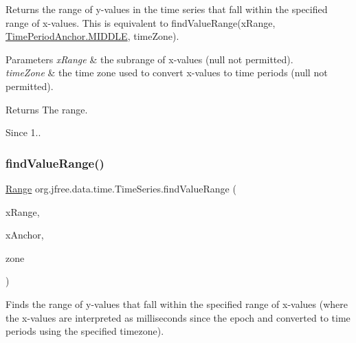 Returns the range of y-\/values in the time series that fall within the specified range of x-\/values. This is equivalent to {\ttfamily find\+Value\+Range(x\+Range, \mbox{\hyperlink{classorg_1_1jfree_1_1data_1_1time_1_1_time_period_anchor_ae6b2bf8530ce0773f48dea83a2594414}{Time\+Period\+Anchor.\+M\+I\+D\+D\+LE}}, time\+Zone)}.


\begin{DoxyParams}{Parameters}
{\em x\+Range} & the subrange of x-\/values ({\ttfamily null} not permitted). \\
\hline
{\em time\+Zone} & the time zone used to convert x-\/values to time periods ({\ttfamily null} not permitted).\\
\hline
\end{DoxyParams}
\begin{DoxyReturn}{Returns}
The range.
\end{DoxyReturn}
\begin{DoxySince}{Since}
1.. 
\end{DoxySince}
\mbox{\label{classorg_1_1jfree_1_1data_1_1time_1_1_time_series_a06dbb6336efea97fcceed8f1a15bfbae}} 
\subsubsection{\texorpdfstring{find\+Value\+Range()}{findValueRange()}\hspace{0.1cm}{\footnotesize\ttfamily [3/3]}}
{\footnotesize\ttfamily \mbox{\hyperlink{classorg_1_1jfree_1_1data_1_1_range}{Range}} org.\+jfree.\+data.\+time.\+Time\+Series.\+find\+Value\+Range (\begin{DoxyParamCaption}\item[{\mbox{\hyperlink{classorg_1_1jfree_1_1data_1_1_range}{Range}}}]{x\+Range,  }\item[{\mbox{\hyperlink{classorg_1_1jfree_1_1data_1_1time_1_1_time_period_anchor}{Time\+Period\+Anchor}}}]{x\+Anchor,  }\item[{Time\+Zone}]{zone }\end{DoxyParamCaption})}

Finds the range of y-\/values that fall within the specified range of x-\/values (where the x-\/values are interpreted as milliseconds since the epoch and converted to time periods using the specified timezone).


